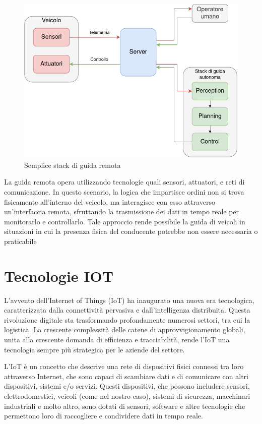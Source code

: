 \begin{figure}[H]
  \centering
  \includegraphics[width=1\textwidth]{figures/guida_remota.png}
  \caption{Semplice stack di guida remota}
  \label{guida_remota}
\end{figure}

\noindent La guida remota opera utilizzando tecnologie quali sensori, attuatori, e reti di comunicazione. In questo scenario, la logica che impartisce ordini non si trova fisicamente all'interno del veicolo, ma interagisce con esso attraverso un'interfaccia remota, sfruttando la trasmissione dei dati in tempo reale per monitorarlo e controllarlo. Tale approccio rende possibile la guida di veicoli in situazioni in cui la presenza fisica del conducente potrebbe non essere necessaria o praticabile

\section{Tecnologie IOT}
L'avvento dell'Internet of Things (IoT) ha inaugurato una nuova era tecnologica, caratterizzata dalla connettività pervasiva e dall'intelligenza distribuita. Questa rivoluzione digitale sta trasformando profondamente numerosi settori, tra cui la logistica. La crescente complessità delle catene di approvvigionamento globali, unita alla crescente domanda di efficienza e tracciabilità, rende l'IoT una tecnologia sempre più strategica per le aziende del settore.

\noindent L'IoT è un concetto che descrive una rete di dispositivi fisici connessi tra loro attraverso Internet, che sono capaci di scambiare dati e di comunicare con altri dispositivi, sistemi e/o servizi. Questi dispositivi, che possono includere sensori, elettrodomestici, veicoli (come nel nostro caso), sistemi di sicurezza, macchinari industriali e molto altro, sono dotati di sensori, software e altre tecnologie che permettono loro di raccogliere e condividere dati in tempo reale.

